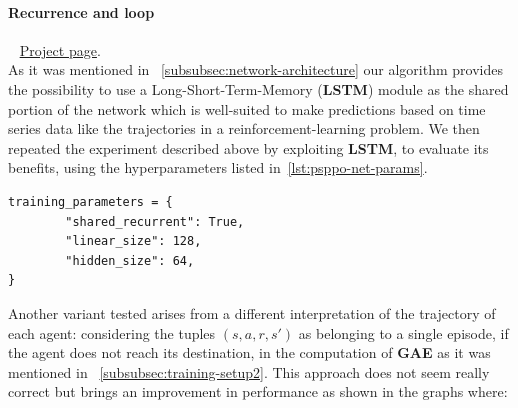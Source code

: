 \documentclass[11pt, a4paper, hidelinks]{report}
\begin{document}
\paragraph{Recurrence and loop}\label{par:psppo_recurrence_loop}
~\newline
\href{https://wandb.ai/fiorenzoparascandolo/flatland-challenge-ps-ppo-test}{Project page}.\\

As it was mentioned in ~\ref{subsubsec:network-architecture} our algorithm provides the possibility to use a Long-Short-Term-Memory (\textbf{LSTM}) module as the shared portion of the network which is well-suited to make predictions based on time series data like the trajectories in a reinforcement-learning problem.
We then repeated the experiment described above by exploiting \textbf{LSTM}, to evaluate its benefits, using the hyperparameters listed in~\ref{lst:psppo-net-params}.
\begin{lstlisting}[label={lst:psppo-net-params}]
training_parameters = {
        "shared_recurrent": True,
        "linear_size": 128,
        "hidden_size": 64,
}
\end{lstlisting}
Another variant tested arises from a different interpretation of the trajectory of each agent: considering the tuples $(s, a, r, s')$ as belonging to a single episode, if the agent does not reach its destination, in the computation of \textbf{GAE} as it was mentioned in ~\ref{subsubsec:training-setup2}.
This approach does not seem really correct but brings an improvement in performance as shown in the graphs where:
\end{document}
